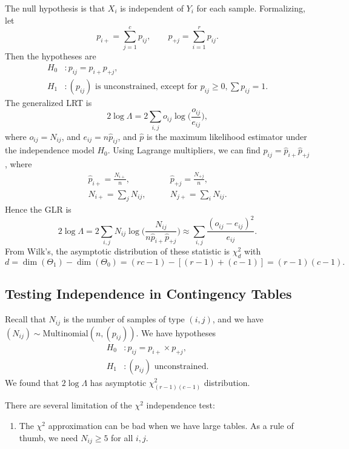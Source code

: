 \documentclass[12pt]{article}
\begin{document}
The null hypothesis is that $X_i$ is independent of $Y_i$ for each sample. Formalizing, let
\[
p_{i+} = \sum_{j = 1}^{c} p_{ij}, \qquad p_{+j} = \sum_{i = 1}^{r} p_{ij}.
\]
Then the hypotheses are
\begin{align*}
	H_0 &: p_{ij} = p_{i+}p_{+j}, \\
	H_1 &: (p_{ij}) \text{ is unconstrained, except for } p_{ij} \geq 0, \sum p_{ij} = 1.
\end{align*}
The generalized LRT is
\[
2 \log \Lambda = 2 \sum_{i,j} o_{ij} \log \biggl( \frac{o_{ij}}{e_{ij}}\biggr),
\]
where $o_{ij} = N_{ij}$, and $e_{ij} = n \hat p_{ij}$, and $\hat p$ is the maximum likelihood estimator under the independence model $H_0$. Using Lagrange multipliers, we can find $\hat p_{ij} = \hat p_{i+} \hat p_{+j}$, where
\begin{align*}
	\hat p_{i+} = \frac{N_{i+}}{n}, \qquad &\hat p_{+j} = \frac{N_{+j}}{n}, \\
	N_{i+} = \sum_{j} N_{ij}, \qquad &N_{j+} = \sum_{i} N_{ij}.
\end{align*}
Hence the GLR is
\[
2 \log \Lambda = 2 \sum_{i, j} N_{ij} \log \biggl( \frac{N_{ij}}{n \hat p_{i+}\hat p_{+j}} \biggr) \approx \sum_{i,j} \frac{(o_{ij} - e_{ij})^2}{e_{ij}}.
\]
From Wilk's, the asymptotic distribution of these statistic is $\chi_d^2$ with
\[
	d = \dim (\Theta_1) - \dim(\Theta_0) = (rc - 1) - [(r-1) + (c-1)] = (r-1)(c-1).
\]


\subsection{Testing Independence in Contingency Tables}
\label{sub:testing_independence_in_contingency_tables}

Recall that $N_{ij}$ is the number of samples of type $(i, j)$, and we have $(N_{ij}) \sim \mathrm{Multinomial}(n, (p_{ij}))$. We have hypotheses
\begin{align*}
	H_0 &: p_{ij} = p_{i+} \times p_{+j},\\
	H_1 &: (p_{ij}) \text{ unconstrained}.
\end{align*}
We found that $2 \log \Lambda$ has asymptotic $\chi^2_{(r-1)(c-1)}$ distribution.

There are several limitation of the $\chi^2$ independence test:
\begin{enumerate}
	\item The $\chi^2$ approximation can be bad when we have large tables. As a rule of thumb, we need $N_{ij} \ge 5$ for all $i, j$.
\end{enumerate}
\end{document}
